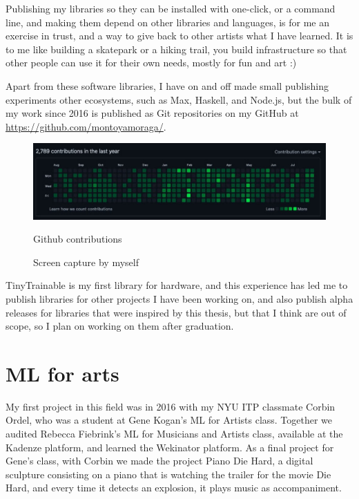 Publishing my libraries so they can be installed with one-click, or a command line, and making them depend on other libraries and languages, is for me an exercise in trust, and a way to give back to other artists what I have learned. It is to me like building a skatepark or a hiking trail, you build infrastructure so that other people can use it for their own needs, mostly for fun and art :)

Apart from these software libraries, I have on and off made small publishing experiments other ecosystems, such as Max, Haskell, and Node.js, but the bulk of my work since 2016 is published as Git repositories on my GitHub at \url{https://github.com/montoyamoraga/}.

\begin{figure}[ht]
  \centering
  \includegraphics[width=0.80\linewidth,height=0.40\textheight,keepaspectratio]{images/github-contributions.jpg}
  \caption{Github contributions}
  \caption*{Screen capture by myself}
  \label{fig:github-contributions}
\end{figure}

TinyTrainable is my first library for hardware, and this experience has led me to publish libraries for other projects I have been working on, and also publish alpha releases for libraries that were inspired by this thesis, but that I think are out of scope, so I plan on working on them after graduation.

\section{ML for arts}

My first project in this field was in 2016 with my \acrshort{NYU} \acrshort{ITP} classmate Corbin Ordel, who was a student at Gene Kogan's \acrshort{ML} for Artists class. Together we audited Rebecca Fiebrink's \acrshort{ML} for Musicians and Artists class, available at the Kadenze platform, and learned the Wekinator platform. As a final project for Gene's class, with Corbin we made the project Piano Die Hard, a digital sculpture consisting on a piano that is watching the trailer for the movie Die Hard, and every time it detects an explosion, it plays music as accompaniment.


